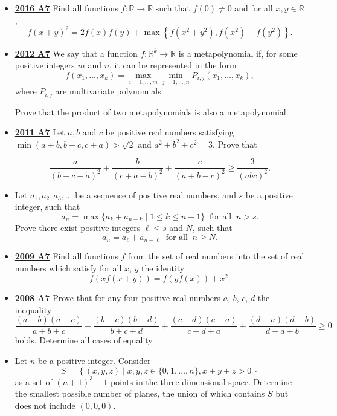 \documentclass[11pt]{scrartcl}
\begin{document}
\begin{itemize}[leftmargin=*]
Prove that at least one of the two numbers $a_{2017}$ and $a_{2018}$ must be greater than or equal to $2017$.
\item \href{https://artofproblemsolving.com/community/c6h1480730p8639356}{\textbf{2016 A7}} 	Find all functions $f:\mathbb{R}\rightarrow\mathbb{R}$ such that $f(0)\neq 0$ and for all $x,y\in\mathbb{R}$,
\[ f(x+y)^2 = 2f(x)f(y) + \max \left\{ f(x^2+y^2), f(x^2)+f(y^2) \right\}. \]
\item \href{https://artofproblemsolving.com/community/c6h546167p3160557}{\textbf{2012 A7}} We say that a function $f:\mathbb{R}^k \rightarrow \mathbb{R}$ is a metapolynomial if, for some positive integers $m$ and $n$, it can be represented in the form
\[f(x_1,\dots , x_k )=\max_{i=1,\dots , m} \min_{j=1,\dots , n}P_{i,j}(x_1,\dots , x_k),\]
where $P_{i,j}$ are multivariate polynomials. 

Prove that the product of two metapolynomials is also a metapolynomial.
\item \href{https://artofproblemsolving.com/community/c6h488538p2737646}{\textbf{2011 A7}} Let $a,b$ and $c$ be positive real numbers satisfying $\min(a+b,b+c,c+a) > \sqrt{2}$ and $a^2+b^2+c^2=3.$ Prove that

\[\frac{a}{(b+c-a)^2} + \frac{b}{(c+a-b)^2} + \frac{c}{(a+b-c)^2} \geqslant  \frac{3}{(abc)^2}.\] 
\newpage

\item {}  Let $a_1, a_2, a_3, \dots$ be a sequence of positive real numbers, and $s$ be a positive integer, such that
\[a_n = \max \{ a_k + a_{n-k} \mid 1 \leqslant k \leqslant n-1 \} \ \textrm{ for all } \ n > s.\]
Prove there exist positive integers $\ell \leqslant s$ and $N$, such that
\[a_n = a_{\ell} + a_{n - \ell} \ \textrm{ for all } \ n \geqslant  N.\]

\item \href{https://artofproblemsolving.com/community/c6h355780p1932915}{\textbf{2009 A7}} Find all functions $f$ from the set of real numbers into the set of real numbers which satisfy for all $x$, $y$ the identity\[ f\left(xf(x+y)\right) = f\left(yf(x)\right) +x^2.\] 	

\item \href{https://artofproblemsolving.com/community/c6h287856p1555900}{\textbf{2008 A7}} Prove that for any four positive real numbers $ a$, $ b$, $ c$, $ d$ the inequality
\[ \frac {(a - b)(a - c)}{a + b + c} + \frac {(b - c)(b - d)}{b + c + d} + \frac {(c - d)(c - a)}{c + d + a} + \frac {(d - a)(d - b)}{d + a + b}\geqslant 0\]
holds. Determine all cases of equality. 

\item {} Let $ n$ be a positive integer. Consider
\[ S = \left\{ (x,y,z) \mid x,y,z \in \{ 0, 1, \dots, n\}, x + y + z > 0 \right \} \]
as a set of $ (n + 1)^{3} - 1$ points in the three-dimensional space.  Determine the smallest possible number of planes, the union of which contains $ S$ but does not include $(0,0,0)$. 

\end{itemize}
\newpage
\end{document}
